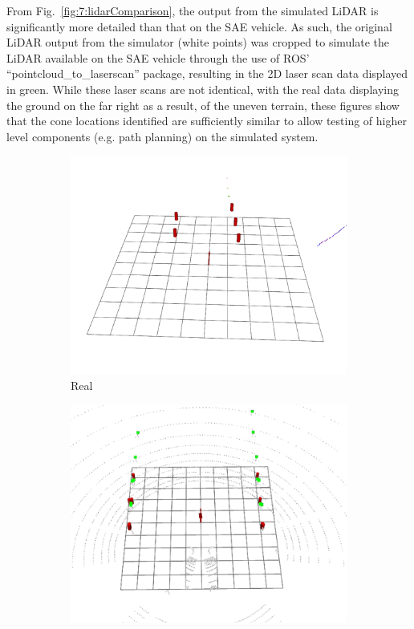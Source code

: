 From Fig.~\ref{fig:7:lidarComparison}, the output from the simulated LiDAR is significantly more detailed than that on the SAE vehicle. As such, the original LiDAR output from the simulator (white points) was cropped to simulate the LiDAR available on the SAE vehicle through the use of ROS' ``pointcloud\_to\_laserscan'' package, resulting in the 2D laser scan data displayed in green. While these laser scans are not identical, with the real data displaying the ground on the far right as a result, of the uneven terrain, these figures show that the cone locations identified are sufficiently similar to allow testing of higher level components (e.g. path planning) on the simulated system.

\begin{figure}[H]
	\centering
	\begin{subfigure}[b]{0.45\textwidth}
		\includegraphics[width=\textwidth]{lidar-real}
		\caption{Real}
		\label{fig:7:lidarComparison:1}   
	\end{subfigure} 
	\hspace{1em}         
	\begin{subfigure}[b]{0.45\textwidth}
		\includegraphics[width=\textwidth]{lidar-sim}

\end{subfigure}
\end{figure}
